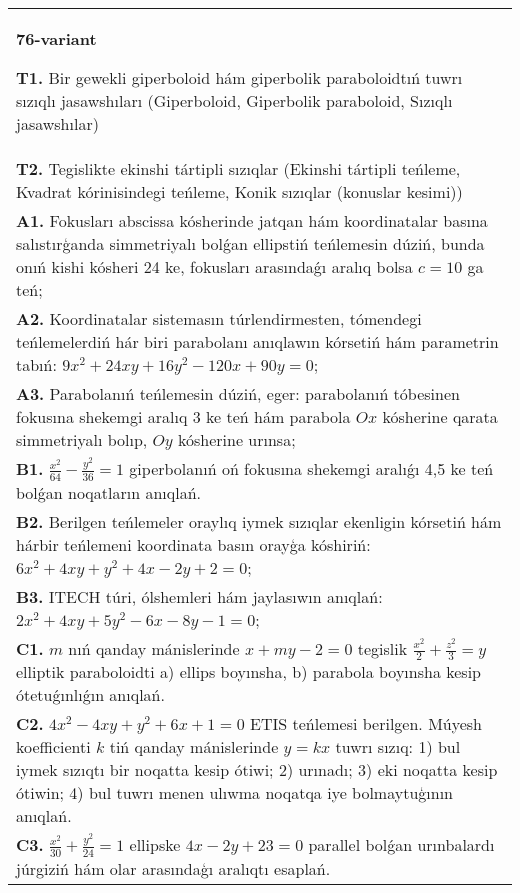 \documentclass{article}
\begin{document}
\begin{tabular}{m{17cm}}
\textbf{76-variant}
\newline

\textbf{T1.} Bir gewekli giperboloid hám giperbolik paraboloidtıń tuwrı sızıqlı jasawshıları (Giperboloid, Giperbolik paraboloid, Sızıqlı jasawshılar) \\
\textbf{T2.} Tegislikte ekinshi tártipli sızıqlar (Ekinshi tártipli teńleme, Kvadrat kórinisindegi teńleme, Konik sızıqlar (konuslar kesimi)) \\
\textbf{A1.} Fokusları abscissa kósherinde jatqan hám koordinatalar basına salıstırģanda simmetriyalı bolǵan ellipstiń teńlemesin dúziń, bunda onıń kishi kósheri 24 ke, fokusları arasındaǵı aralıq bolsa $c = 10$ ga teń; \\
\textbf{A2.} Koordinatalar sistemasın túrlendirmesten, tómendegi teńlemelerdiń hár biri parabolanı anıqlawın kórsetiń hám parametrin tabıń: $9 x^2+24 x y+16 y^2-120 x+90 y=0$; \\
\textbf{A3.} Parabolanıń teńlemesin dúziń, eger: parabolanıń tóbesinen fokusına shekemgi aralıq 3 ke teń hám parabola $O x$ kósherine qarata simmetriyalı bolıp, $O y$ kósherine urınsa; \\
\textbf{B1.} $\frac{x^2}{64}-\frac{y^2}{36}=1$ giperbolanıń oń fokusına shekemgi aralıǵı 4,5 ke teń bolǵan noqatların anıqlań. \\
\textbf{B2.} Berilgen teńlemeler oraylıq iymek sızıqlar ekenligin kórsetiń hám hárbir teńlemeni koordinata basın orayģa kóshiriń: $6 x^2+4 x y+y^2+4 x-2 y+2=0$; \\
\textbf{B3.} ITECH túri, ólshemleri hám jaylasıwın anıqlań: $2 x^2+4 x y+5 y^2-6 x-8 y-1=0$; \\
\textbf{C1.} $m$ nıń qanday mánislerinde $x+m y-2=0$ tegislik $\frac{x^2}{2}+\frac{z^2}{3}=y$ elliptik paraboloidti a) ellips boyınsha, b) parabola boyınsha kesip ótetuǵınlıǵın anıqlań. \\
\textbf{C2.} $4 x^2-4 x y+y^2+6 x+1=0$ ETIS teńlemesi berilgen. Múyesh koefficienti $k$ tiń qanday mánislerinde $y=kx$ tuwrı sızıq: 1) bul iymek sızıqtı bir noqatta kesip ótiwi; 2) urınadı; 3) eki noqatta kesip ótiwin; 4) bul tuwrı menen ulıwma noqatqa iye bolmaytuģının anıqlań. \\
\textbf{C3.} $\frac{x^2}{30}+\frac{y^2}{24}=1$ ellipske $4x-2y+23=0$ parallel bolǵan urınbalardı júrgiziń hám olar arasındaģı aralıqtı esaplań. \\

\end{tabular}
\vspace{1cm}
\end{document}
